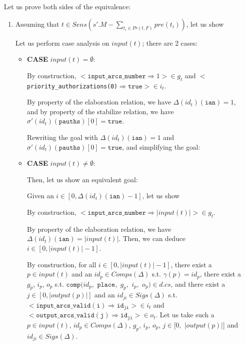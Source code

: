 \documentclass[dvipsnames,12pt]{article}
\begin{document}
\begin{niproof}
  Let us prove both sides of the equivalence:
  \begin{enumerate}
  \item\label{item:stab-comp-spc-fst-case} Assuming that
    $t\in{}Sens(s'.M-\sum\limits_{t_i\in{}Pr(t,F)}pre(t_i))$, let us
    show\\

    Let us perform case analysis on $input(t)$; there are 2 cases:
    \begin{itemize}
    \item \textbf{CASE} $input(t)=\emptyset$:

      By construction,
      ${<}\mathtt{input\_arcs\_number\Rightarrow}{}1{>}\in{}g_t$ and
      ${<}$\texttt{priority\_authorizations(0)}$\Rightarrow{}\mathtt{true}{>}\in{}i_t$.

      By property of the elaboration relation, we have
      $\Delta(id_t)(\texttt{ian})=1$, and by property of the stabilize
      relation, we have
      $\sigma'(id_t)(\texttt{pauths})[0]=\mathtt{true}$.
      
      Rewriting the goal with $\Delta(id_t)(\texttt{ian})=1$ and
      $\sigma'(id_t)(\texttt{pauths})[0]=\mathtt{true}$, and
      simplifying the goal: 
      
    \item \textbf{CASE} $input(t)\neq{}\emptyset$:

      Then, let us show an equivalent goal:\\

      Given an $i\in{}[0,\Delta(id_t)(\texttt{ian})-1]$, let us show

      By construction,
      ${<}\mathtt{input\_arcs\_number\Rightarrow}{}\vert{}input(t)\vert{>}\in{}g_t$.

      By property of the elaboration relation, we have
      $\Delta(id_t)(\texttt{ian})=\vert{}input(t)\vert$. Then, we can deduce
      $i\in{}[0,\vert{}input(t)\vert-1]$.
      
      By construction, for all $i\in{}[0,\vert{}input(t)\vert-1]$,
      there exist a $p\in{}input(t)$ and an $id_p\in{}Comps(\Delta)$
      s.t. $\gamma(p)=id_p$, there exist a $g_p$, $i_p$, $o_p$
      s.t. $\mathtt{comp}(id_p,$ $\texttt{place},$ $g_p,$ $i_p,$
      $o_p)\in{}d.cs$, and there exist a
      $j\in{}[0,\vert{}output(p)\vert]$ and an
      $id_{ji}\in{}Sigs(\Delta)$ s.t.\\
      ${<}\mathtt{input\_arcs\_valid(i)\Rightarrow{}id_{ji}}{>}\in{}i_t$
      and
      ${<}\mathtt{output\_arcs\_valid(j)\Rightarrow{}id_{ji}}{>}\in{}o_t$.
      Let us take such a $p\in{}input(t)$, $id_p\in{}Comps(\Delta)$,
      $g_p$, $i_p$, $o_p$, $j\in{}[0,$ $\vert{}output(p)\vert]$ and
      $id_{ji}\in{}Sigs(\Delta)$.\\


\end{itemize}
\end{enumerate}
\end{niproof}
\end{document}
